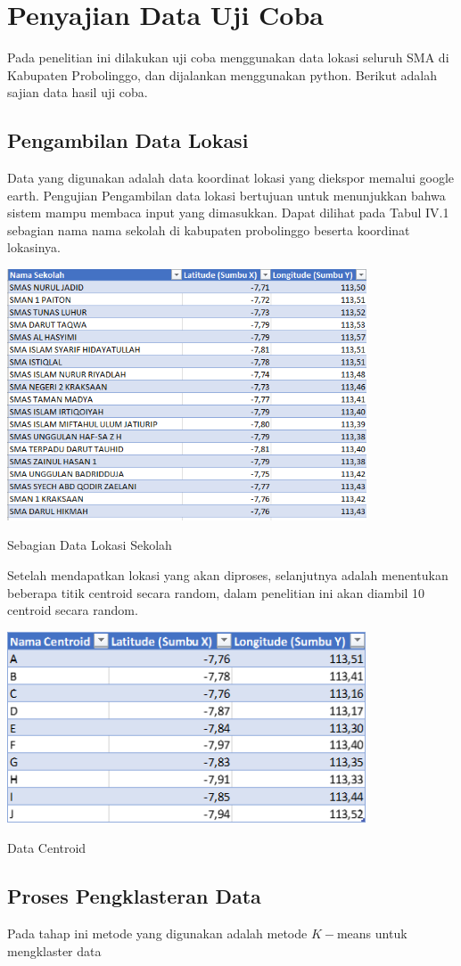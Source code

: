 \section{Penyajian Data Uji Coba}

Pada penelitian ini dilakukan uji coba menggunakan data lokasi seluruh SMA di Kabupaten Probolinggo, dan dijalankan menggunakan python. Berikut adalah sajian data hasil uji coba.

\subsection{Pengambilan Data Lokasi}

Data yang digunakan adalah data koordinat lokasi yang diekspor memalui google earth. Pengujian Pengambilan data lokasi bertujuan untuk menunjukkan bahwa sistem 
mampu membaca input yang dimasukkan. Dapat dilihat pada Tabul IV.1 sebagian nama nama sekolah di kabupaten probolinggo beserta koordinat lokasinya.

\begin{table}
  \centering
  \includegraphics[width=0.8\textwidth]{data lokasi sekolah.png}
  \caption{Sebagian Data Lokasi Sekolah}
\end{table}

Setelah mendapatkan lokasi yang akan diproses, selanjutnya adalah menentukan beberapa titik centroid secara random, dalam penelitian ini akan diambil 10 centroid secara random.

\begin{table}
	\centering
	\includegraphics[width=0.8\textwidth]{centroid.png}
	\caption{Data Centroid}
\end{table}

\subsection{Proses Pengklasteran Data}

Pada tahap ini metode yang digunakan adalah metode $K-$means untuk mengklaster data